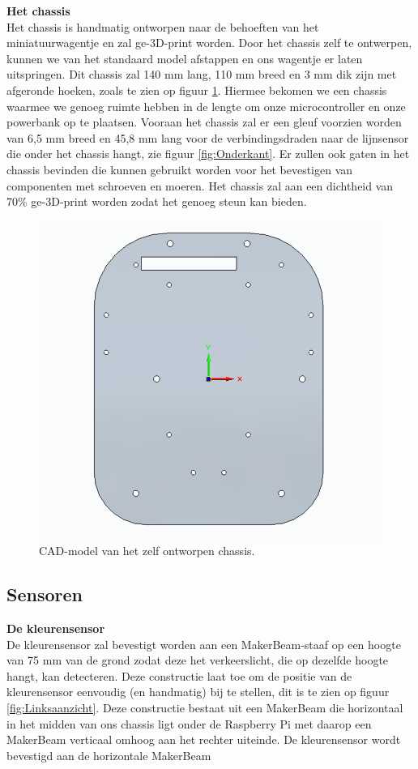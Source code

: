 \documentclass[a4paper,kulak]{kulakarticle}
\begin{document}
\textbf{\large Het chassis} \\
Het chassis is handmatig ontworpen naar de behoeften van het miniatuurwagentje en zal ge-3D-print worden. Door het chassis zelf te ontwerpen, kunnen we van het standaard model afstappen en ons wagentje er laten uitspringen. Dit chassis zal 140 mm lang, 110 mm breed en 3 mm dik zijn met afgeronde hoeken, zoals te zien op figuur \ref{fig:chassis}. Hiermee bekomen we een chassis waarmee we genoeg ruimte hebben in de lengte om onze microcontroller en onze powerbank op te plaatsen. Vooraan het chassis zal er een gleuf voorzien worden van 6,5 mm breed en 45,8 mm lang voor de verbindingsdraden naar de lijnsensor die onder het chassis hangt, zie figuur \ref{fig:Onderkant}. Er zullen ook gaten in het chassis bevinden die kunnen gebruikt worden voor het bevestigen van componenten met schroeven en moeren. Het chassis zal aan een dichtheid van 70\% ge-3D-print worden zodat het genoeg steun kan bieden.

\begin{figure}[h]
	\centering
	\includegraphics[width=.4\textwidth] {chassis3d}
	\caption{CAD-model van het zelf ontworpen chassis.}
	\label{fig:chassis}
\end{figure}

\subsection{Sensoren}
\textbf{\large De kleurensensor} \\
De kleurensensor zal bevestigt worden aan een MakerBeam-staaf op een hoogte van 75 mm van de grond zodat deze het verkeerslicht, die op dezelfde hoogte hangt, kan detecteren. Deze constructie laat toe om de positie van de kleurensensor eenvoudig (en handmatig) bij te stellen, dit is te zien op figuur \ref{fig:Linksaanzicht}. Deze constructie bestaat uit een MakerBeam die horizontaal in het midden van ons chassis ligt onder de Raspberry Pi met daarop een MakerBeam verticaal omhoog aan het rechter uiteinde. De kleurensensor wordt bevestigd aan de horizontale MakerBeam
\end{document}
